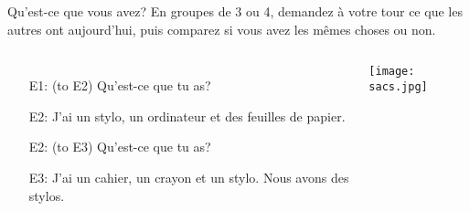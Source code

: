 \begin{frame}{Qu'est-ce que vous avez? }
  \small
  En groupes de 3 ou 4, demandez à votre tour ce que les autres ont aujourd'hui, puis comparez si vous avez les mêmes choses ou non. \\
  \begin{columns}
      \begin{itemize}
        \item[E1:] (to E2) Qu'est-ce que tu as?
        \item[] 
        \item[E2:] J'ai un \alert{stylo}, un ordinateur et des feuilles de papier.
        \item[] 
        \item[E2:] (to E3) Qu'est-ce que tu as?
        \item[] 
        \item[E3:] J'ai un cahier, un crayon et un \alert{stylo}. Nous avons \alert{des stylos}.
        \item[] 
      \end{itemize}
      \begin{center}
        \texttt{[image: sacs.jpg]}
      \end{center}
  \end{columns}
\end{frame}